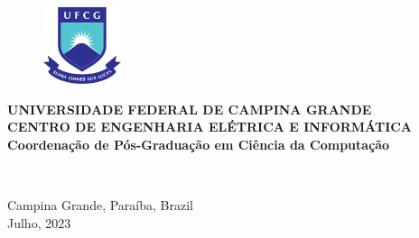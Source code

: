 \begin{figure}[H]
\centering
\includegraphics[height=85px]{images/logo_ufcg.png}
\end{figure}

\begin{center}
\textbf{UNIVERSIDADE FEDERAL DE CAMPINA GRANDE} \\
\textbf{CENTRO DE ENGENHARIA ELÉTRICA E INFORMÁTICA} \\
\textbf{Coordenação de Pós-Graduação em Ciência da Computação}
\vspace{6em}

\Large{\theauthor}\\
\vspace{6em}

\Large
\thetitle

\vfill

\normalsize
Campina Grande, Paraíba, Brazil \\
Julho, 2023 %
\end{center}